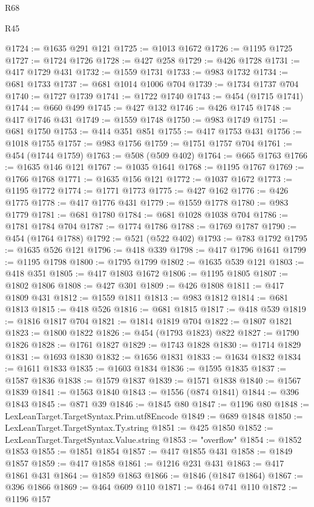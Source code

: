 \begin{lexlean}{R68}
\begin{lexlean}{R45}
\begin{coremodule}
{{{{{{{{{{{{{{{{{{{{{{{{{{{{{{{{{{{{{{{{{{{{{{{{{{{{{{{{{{{{{{{{{{{{{{{{{{{{{{{{{{{{{{{{{{{@1724 := @1635 @291 @121
@1725 := @1013 @1672
@1726 := @1195 @1725
@1727 := @1724 @1726
@1728 := @427 @258
@1729 := @426 @1728
@1731 := @417 @1729 @431
@1732 := @1559 @1731
@1733 := @983 @1732
@1734 := @681 @1733
@1737 := @681 @1014 @1006 @704
@1739 := @1734 @1737 @704
@1740 := @1727 @1739
@1741 := @1722 @1740
@1743 := @454 (@1715 @1741)
@1744 := @660 @499
@1745 := @427 @132
@1746 := @426 @1745
@1748 := @417 @1746 @431
@1749 := @1559 @1748
@1750 := @983 @1749
@1751 := @681 @1750
@1753 := @414 @351 @851
@1755 := @417 @1753 @431
@1756 := @1018 @1755
@1757 := @983 @1756
@1759 := @1751 @1757 @704
@1761 := @454 (@1744 @1759)
@1763 := @508 (@509 @402)
@1764 := @665 @1763
@1766 := @1635 @146 @121
@1767 := @1035 @1641
@1768 := @1195 @1767
@1769 := @1766 @1768
@1771 := @1635 @156 @121
@1772 := @1037 @1672
@1773 := @1195 @1772
@1774 := @1771 @1773
@1775 := @427 @162
@1776 := @426 @1775
@1778 := @417 @1776 @431
@1779 := @1559 @1778
@1780 := @983 @1779
@1781 := @681 @1780
@1784 := @681 @1028 @1038 @704
@1786 := @1781 @1784 @704
@1787 := @1774 @1786
@1788 := @1769 @1787
@1790 := @454 (@1764 @1788)
@1792 := @521 (@522 @402)
@1793 := @783 @1792
@1795 := @1635 @526 @121
@1796 := @418 @339
@1798 := @417 @1796 @1641
@1799 := @1195 @1798
@1800 := @1795 @1799
@1802 := @1635 @539 @121
@1803 := @418 @351
@1805 := @417 @1803 @1672
@1806 := @1195 @1805
@1807 := @1802 @1806
@1808 := @427 @301
@1809 := @426 @1808
@1811 := @417 @1809 @431
@1812 := @1559 @1811
@1813 := @983 @1812
@1814 := @681 @1813
@1815 := @418 @526
@1816 := @681 @1815
@1817 := @418 @539
@1819 := @1816 @1817 @704
@1821 := @1814 @1819 @704
@1822 := @1807 @1821
@1823 := @1800 @1822
@1826 := @454 (@1793 @1823) @822
@1827 := @1790 @1826
@1828 := @1761 @1827
@1829 := @1743 @1828
@1830 := @1714 @1829
@1831 := @1693 @1830
@1832 := @1656 @1831
@1833 := @1634 @1832
@1834 := @1611 @1833
@1835 := @1603 @1834
@1836 := @1595 @1835
@1837 := @1587 @1836
@1838 := @1579 @1837
@1839 := @1571 @1838
@1840 := @1567 @1839
@1841 := @1563 @1840
@1843 := @1556 (@874 @1841)
@1844 := @396 @1843
@1845 := @871 @39
@1846 := @1845 @80
@1847 := @1196 @80
@1848 := LexLeanTarget.TargetSyntax.Prim.utf8Encode
@1849 := @689 @1848
@1850 := LexLeanTarget.TargetSyntax.Ty.string
@1851 := @425 @1850
@1852 := LexLeanTarget.TargetSyntax.Value.string
@1853 := "overflow"
@1854 := @1852 @1853
@1855 := @1851 @1854
@1857 := @417 @1855 @431
@1858 := @1849 @1857
@1859 := @417 @1858
@1861 := @1216 @231 @431
@1863 := @417 @1861 @431
@1864 := @1859 @1863
@1866 := @1846 (@1847 @1864)
@1867 := @396 @1866
@1869 := @464 @609 @110
@1871 := @464 @741 @110
@1872 := @1196 @157
}}}}}}}}}}}}}}}}}}}}}}}}}}}}}}}}}}}}}}}}}}}}}}}}}}}}}}}}}}}}}}}}}}}}}}}}}}}}}}}}}}}}}}}}}}}
\end{coremodule}
\end{lexlean}
\end{lexlean}
